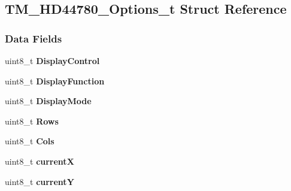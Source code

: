 \hypertarget{struct_t_m___h_d44780___options__t}{}\subsection{T\+M\+\_\+\+H\+D44780\+\_\+\+Options\+\_\+t Struct Reference}
\label{struct_t_m___h_d44780___options__t}
\subsubsection*{Data Fields}
\begin{DoxyCompactItemize}
\item 
\hypertarget{struct_t_m___h_d44780___options__t_a8658d21ed4a5d06b5d9c08c841f1feca}{}uint8\+\_\+t {\bfseries Display\+Control}\label{struct_t_m___h_d44780___options__t_a8658d21ed4a5d06b5d9c08c841f1feca}

\item 
\hypertarget{struct_t_m___h_d44780___options__t_aae44fc505a373e01955fab2b5df33ca2}{}uint8\+\_\+t {\bfseries Display\+Function}\label{struct_t_m___h_d44780___options__t_aae44fc505a373e01955fab2b5df33ca2}

\item 
\hypertarget{struct_t_m___h_d44780___options__t_ae939b01146c8d67526fecaeb2a6c0fa4}{}uint8\+\_\+t {\bfseries Display\+Mode}\label{struct_t_m___h_d44780___options__t_ae939b01146c8d67526fecaeb2a6c0fa4}

\item 
\hypertarget{struct_t_m___h_d44780___options__t_ae18941a22e0a7c62d613e615e84a24c3}{}uint8\+\_\+t {\bfseries Rows}\label{struct_t_m___h_d44780___options__t_ae18941a22e0a7c62d613e615e84a24c3}

\item 
\hypertarget{struct_t_m___h_d44780___options__t_ab451b2c1f44ba31bfce07bedc492c9d1}{}uint8\+\_\+t {\bfseries Cols}\label{struct_t_m___h_d44780___options__t_ab451b2c1f44ba31bfce07bedc492c9d1}

\item 
\hypertarget{struct_t_m___h_d44780___options__t_abad57022cef6c1b35171e427c7f9bf48}{}uint8\+\_\+t {\bfseries current\+X}\label{struct_t_m___h_d44780___options__t_abad57022cef6c1b35171e427c7f9bf48}

\item 
\hypertarget{struct_t_m___h_d44780___options__t_a952cf5fd416dbc1106b47d8796bd8405}{}uint8\+\_\+t {\bfseries current\+Y}\label{struct_t_m___h_d44780___options__t_a952cf5fd416dbc1106b47d8796bd8405}

\end{DoxyCompactItemize}
